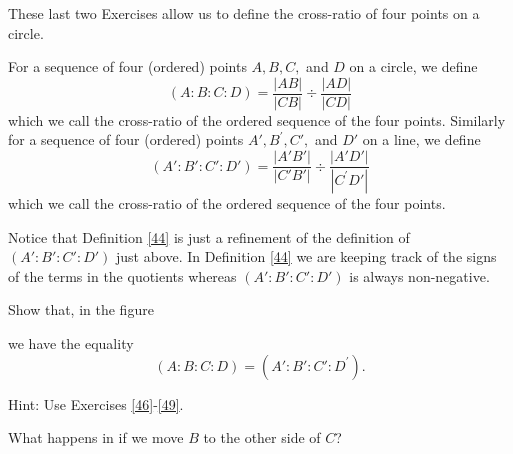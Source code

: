 These last two Exercises allow us to define the cross-ratio of four
points on a circle.

\begin{definition}
For a sequence of four (ordered) points $A,B,C,$ and $D$ on a circle,
we define%
\[
\left(  A:B:C:D\right)  =\frac{\left\vert AB\right\vert }{\left\vert
CB\right\vert }\div\frac{\left\vert AD\right\vert }{\left\vert CD\right\vert }%
\]
which we call the cross-ratio of the ordered sequence of the four points.
Similarly for a sequence of four (ordered) points $A',B^{\prime
},C',$ and $D'$ on a line, we define%
\[
\left(  A':B':C':D'\right)  =\frac{\left\vert
A'B'\right\vert }{\left\vert C'B'\right\vert
}\div\frac{\left\vert A'D'\right\vert }{\left\vert C^{\prime
}D'\right\vert }%
\]
which we call the cross-ratio of the ordered sequence of the four points.
\end{definition}

Notice that Definition \ref{44} is just a refinement of the definition
of $\left( A':B':C':D'\right) $ just above. In Definition \ref{44} we
are keeping track of the signs of the terms in the quotients whereas
$\left( A':B':C':D'\right)$ is always non-negative.

\begin{exercise}\label{50}
Show that, in the figure%
\begin{image}
\end{image}
we have the equality%
\[
\left(  A:B:C:D\right)  =\left(  A':B':C':D^{\prime
}\right)  .
\]


Hint: Use Exercises \ref{46}-\ref{49}.

What happens in if we move $B$ to the other side of $C$?
\end{exercise}

